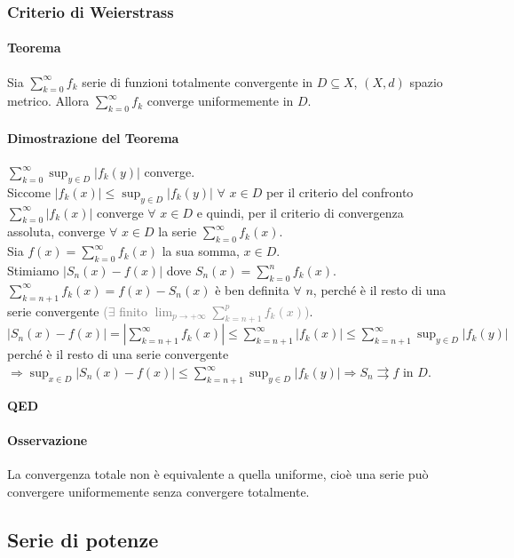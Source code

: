 \documentclass{article}
\begin{document}
\subsubsection{{Criterio di Weierstrass}}
\paragraph{{Teorema}}
Sia $\sum_{k=0}^{\infty}f_k$ serie di funzioni totalmente convergente in $ D \subseteq X$, $ (X,d)$ spazio metrico. Allora $\sum_{k=0}^{\infty}f_k$ converge uniformemente in $D$.

\paragraph{Dimostrazione del Teorema}
$\sum_{k=0}^{\infty}\sup_{y \in D} |f_k(y)|$ converge.\\
Siccome $|f_k(x)|\leq \sup_{y \in D}|f_k(y)|\,\, \forall\,\, x \in D$ per il criterio del confronto $\sum_{k=0}^{\infty}|f_k(x)|$ converge $\forall \,\, x \in D$ e quindi, per il criterio di convergenza assoluta, converge $\forall\,\, x \in D$ la serie $\sum_{k=0}^{\infty} f_k(x)$.\\ 
Sia $f(x)=\sum_{k=0}^{\infty}f_k(x)$ la sua somma, $x \in D$.\\
Stimiamo $|S_n(x)-f(x)|$ dove $S_n(x)=\sum_{k=0}^{n}f_k(x)$.\\ $\sum_{k=n+1}^{\infty}f_k(x)=f(x)-S_n(x)$ è ben definita $\forall \,\, n$, perché è il resto di una serie convergente
\textcolor{grey}{($\exists$ finito $\lim_{p \rightarrow+\infty}\sum_{k=n+1}^{p}f_k(x)$)}.\\ 
$|S_n(x)-f(x)|=|\sum_{k=n+1}^{\infty}f_k(x)|\leq \sum_{k=n+1}^{\infty}|f_k(x)| \leq \sum_{k=n+1}^{\infty} \sup_{y \in D}|f_k(y)|$ perché è il resto di una serie convergente $\Rightarrow \sup_{x \in D}|S_n(x)-f(x)|\leq \sum_{k=n+1}^{\infty}\sup_{y \in D} |f_k(y)| \Rightarrow S_n \rightrightarrows f$ in $D$.
\begin{flushright}
\textbf{QED}
\end{flushright}

\paragraph{Osservazione}
La convergenza totale non è equivalente a quella uniforme, cioè una serie può convergere uniformemente senza convergere totalmente.

\subsection{{Serie di potenze}}
\end{document}
